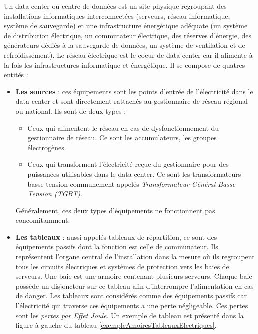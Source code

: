 Un data center ou centre de donn\'ees est un site physique regroupant des installations informatiques interconnect\'ees (serveurs, r\'eseau informatique, syst\`eme de sauvegarde) et une infrastructure \'energ\'etique ad\'equate (un syst\`eme de distribution \'electrique, un commutateur \'electrique, des r\'eserves d'\'energie, des g\'en\'erateurs d\'edi\'es \`a la sauvegarde de donn\'ees, un syst\`eme de ventilation et de refroidissement).
\newline
Le r\'eseau \'electrique est le coeur de data center car il alimente \`a la fois les infrastructures informatique et \'energ\'etique. Il se compose de quatres entit\'es :
\begin{itemize}
\item {\bf Les sources} : 
ces \'equipements sont les points d'entr\'ee de l'\'electricit\'e dans le data center et sont directement rattach\'es au gestionnaire de r\'eseau r\'egional ou national. 
Ils sont de deux types : 
\begin{itemize}
\item Ceux qui alimentent le  r\'eseau en cas de dysfonctionnement du gestionnaire de r\'eseau. Ce sont les accumulateurs, les groupes \'electrog\`enes.
\item Ceux qui transforment l'\'electricit\'e re\c cue du gestionnaire pour des puissances utilisables dans le data center. Ce sont les transformateurs basse tension communement appel\'es {\em Transformateur G\'en\'eral Basse Tension (TGBT)}. 
\end{itemize}
G\'en\'eralement, ces deux types d'\'equipements ne fonctionnent pas concomitamment.


\item {\bf Les tableaux} :
aussi appel\'es tableaux de r\'epartition, ce sont des \'equipements passifs dont la fonction est celle de communateur. 
Ils repr\'esentent l'organe central de l'installation dans la mesure o\`u ils regroupent tous les circuits \'electriques et syst\`emes de protection vers les baies de serveurs. 
Une baie est une armoire contenant plusieurs serveurs.
Chaque baie poss\`ede un disjoncteur sur ce tableau afin d'interrompre l'alimentation en cas de danger. 
Les tableaux sont consid\'er\'es comme des \'equipements passifs car l'\'electricit\'e qui traverse ces \'equipements a une perte n\'egligeable.   Ces pertes sont les {\em pertes par Effet Joule}. Un exemple de tableau est pr\'esent\'e dans la figure \`a gauche du tableau \ref{exempleAmoiresTableauxElectriques}. 


\end{itemize}
